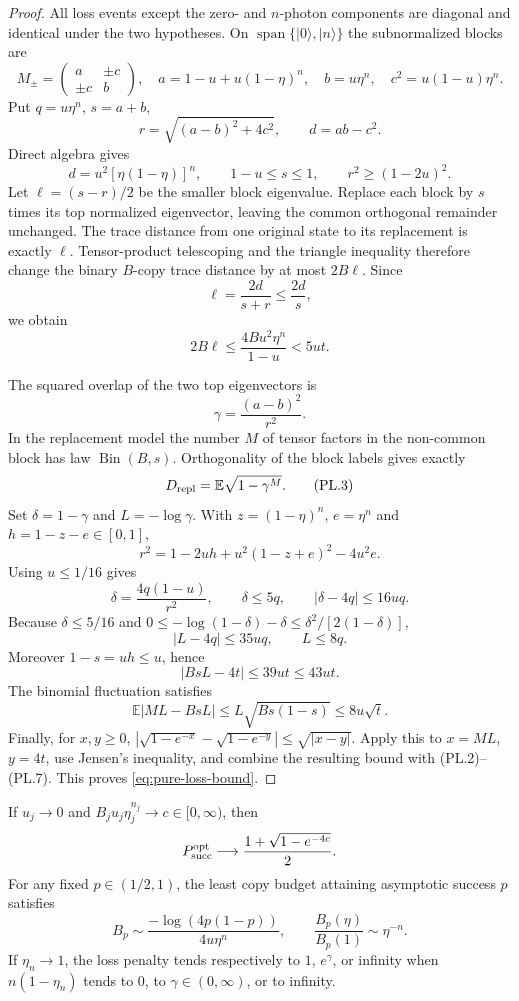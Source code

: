 \begin{proof}
All loss events except the zero- and $n$-photon components are diagonal and
identical under the two hypotheses. On
$\operatorname{span}\{|0\rangle,|n\rangle\}$ the subnormalized blocks are
\[
 M_\pm=\begin{pmatrix}a&\pm c\\ \pm c&b\end{pmatrix},
 \quad a=1-u+u(1-\eta)^n,\quad b=u\eta^n,
 \quad c^2=u(1-u)\eta^n.
\]
Put $q=u\eta^n$, $s=a+b$,
\[
 r=\sqrt{(a-b)^2+4c^2},\qquad d=ab-c^2.
\]
Direct algebra gives
\[
 d=u^2[\eta(1-\eta)]^n,\qquad 1-u\le s\le1,
 \qquad r^2\ge(1-2u)^2.
\]
Let $\ell=(s-r)/2$ be the smaller block eigenvalue. Replace each block by
$s$ times its top normalized eigenvector, leaving the common orthogonal
remainder unchanged. The trace distance from one original state to its
replacement is exactly $\ell$. Tensor-product telescoping and the triangle
inequality therefore change the binary $B$-copy trace distance by at most
$2B\ell$. Since
\[
 \ell=\frac{2d}{s+r}\le\frac{2d}{s},
\]
we obtain
\[
 2B\ell\le\frac{4Bu^2\eta^n}{1-u}<5ut. \tag{PL.2}
\]

The squared overlap of the two top eigenvectors is
\[
 \gamma=\frac{(a-b)^2}{r^2}.
\]
In the replacement model the number $M$ of tensor factors in the
non-common block has law $\operatorname{Bin}(B,s)$. Orthogonality of the
block labels gives exactly
\[
 D_{\rm repl}=\mathbb E\sqrt{1-\gamma^M}. \tag{PL.3}
\]
Set $\delta=1-\gamma$ and $L=-\log\gamma$. With
$z=(1-\eta)^n$, $e=\eta^n$ and $h=1-z-e\in[0,1]$,
\[
 r^2=1-2uh+u^2(1-z+e)^2-4u^2e.
\]
Using $u\le1/16$ gives
\[
 \delta=\frac{4q(1-u)}{r^2},\qquad
 \delta\le5q,\qquad |\delta-4q|\le16uq. \tag{PL.4}
\]
Because $\delta\le5/16$ and
$0\le-\log(1-\delta)-\delta\le\delta^2/[2(1-\delta)]$,
\[
 |L-4q|\le35uq,\qquad L\le8q. \tag{PL.5}
\]
Moreover $1-s=uh\le u$, hence
\[
 |BsL-4t|\le39ut\le43ut. \tag{PL.6}
\]
The binomial fluctuation satisfies
\[
 \mathbb E|ML-BsL|\le L\sqrt{Bs(1-s)}\le8u\sqrt t. \tag{PL.7}
\]
Finally, for $x,y\ge0$,
$|\sqrt{1-e^{-x}}-\sqrt{1-e^{-y}}|\le\sqrt{|x-y|}$.
Apply this to $x=ML$, $y=4t$, use Jensen's inequality, and combine the
resulting bound with (PL.2)--(PL.7). This proves \eqref{eq:pure-loss-bound}.
\end{proof}

\begin{corollary}
\label{cor:pure-loss-transition}
If $u_j\to0$ and $B_ju_j\eta_j^{n_j}\to c\in[0,\infty)$, then
\[
 P_{\rm succ}^{\rm opt}\longrightarrow
 \frac{1+\sqrt{1-e^{-4c}}}{2}.
\]
For any fixed $p\in(1/2,1)$, the least copy budget attaining asymptotic
success $p$ satisfies
\[
 B_p\sim\frac{-\log(4p(1-p))}{4u\eta^n},
 \qquad \frac{B_p(\eta)}{B_p(1)}\sim\eta^{-n}. \tag{PL.8}
\]
If $\eta_n\to1$, the loss penalty tends respectively to $1$, $e^\gamma$,
or infinity when $n(1-\eta_n)$ tends to $0$, to
$\gamma\in(0,\infty)$, or to infinity.
\end{corollary}


